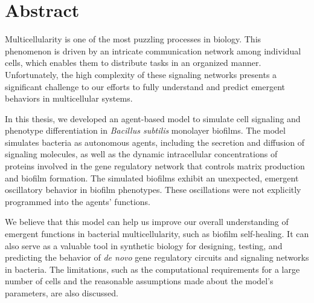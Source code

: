 \chapter*{Abstract}

Multicellularity is one of the most puzzling processes in biology. This phenomenon is driven by an intricate communication network among individual cells, which enables them to distribute tasks in an organized manner. Unfortunately, the high complexity of these signaling networks presents a significant challenge to our efforts to fully understand and predict emergent behaviors in multicellular systems.


In this thesis, we developed an agent-based model to simulate cell signaling and phenotype differentiation in \textit{Bacillus subtilis} monolayer biofilms. The model simulates bacteria as autonomous agents, including the secretion and diffusion of signaling molecules, as well as the dynamic intracellular concentrations of proteins involved in the gene regulatory network that controls matrix production and biofilm formation. The simulated biofilms exhibit an unexpected, emergent oscillatory behavior in biofilm phenotypes. These oscillations were not explicitly programmed into the agents' functions.


We believe that this model can help us improve our overall understanding of emergent functions in bacterial multicellularity, such as biofilm self-healing. It can also serve as a valuable tool in synthetic biology for designing, testing, and predicting the behavior of \textit{de novo} gene regulatory circuits and signaling networks in bacteria. The limitations, such as the computational requirements for a large number of cells and the reasonable assumptions made about the model's parameters, are also discussed.
